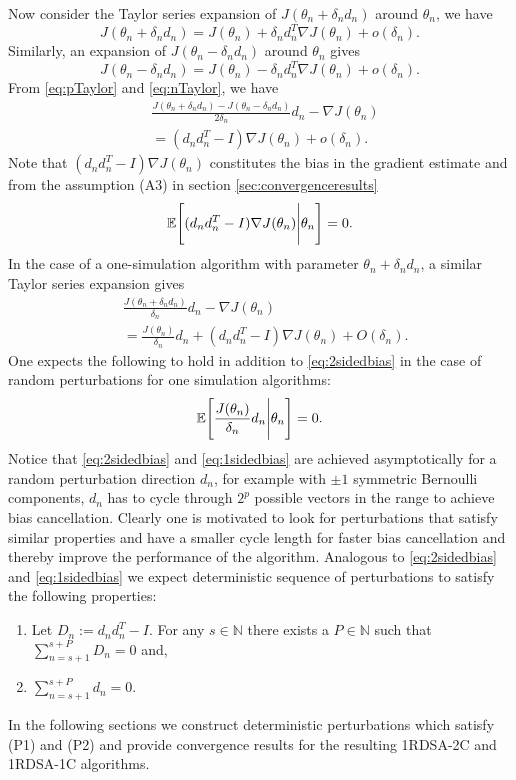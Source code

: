 \documentclass[letterpaper, 10 pt, conference]{ieeeconf}  %
\begin{document}
Now consider the Taylor series expansion of $J(\theta_n+\delta_nd_n)$ around
$\theta_n$, we have
\begin{equation} \label{eq:pTaylor}
J(\theta_n+\delta_nd_n)=
J(\theta_n)+\delta_nd_n^T \nabla J(\theta_n)+o(\delta_n).
\end{equation}
Similarly, an expansion of $J(\theta_n-\delta_n d_n)$ around $\theta_n$ gives
\begin{equation} \label{eq:nTaylor}
J(\theta_n-\delta_n d_n)=
J(\theta_n)-\delta_n d_n^T \nabla J(\theta_n)+o(\delta_n).
\end{equation}
From \eqref{eq:pTaylor} and \eqref{eq:nTaylor}, we have
\begin{align}\label{eq:Taylor}
&\frac{J(\theta_n+\delta_n d_n)-J(\theta_n-\delta_n d_n)}{2\delta_n}d_n
- \nabla J(\theta_n) \\
&= (d_nd_n^T-I)\nabla J(\theta_n)+o(\delta_n).
\end{align}
Note that $(d_nd_n^T-I)\nabla J(\theta_n)$ constitutes the bias in the
gradient estimate and
from the assumption (A3) in section \ref{sec:convergenceresults}
\begin{equation}\label{eq:2sidedbias}
\mathbb{E}\Bigg{[}(d_nd_n^T-I)\nabla J(\theta_n)\Bigg{|}\theta_n\Bigg{]}=0.
\end{equation}
In the case of a one-simulation algorithm with parameter $\theta_n+\delta_n d_n$,
a similar Taylor series expansion gives
\begin{align}\label{eq:1sided}
&\frac{J(\theta_n+\delta_n d_n)}{\delta_n}d_n
- \nabla J(\theta_n) \\
&=\frac{J(\theta_n)}{\delta_n}d_n
+(d_nd_n^T-I)\nabla J(\theta_n)+O(\delta_n).
\end{align}
One expects the following to hold in addition to \eqref{eq:2sidedbias} in the case of 
random perturbations for one simulation algorithms:
\begin{equation}\label{eq:1sidedbias}
\mathbb{E}\Bigg{[}\frac{J(\theta_n)}{\delta_n}d_n\Bigg{|}\theta_n\Bigg{]}=0. 
\end{equation}
Notice that \eqref{eq:2sidedbias} and \eqref{eq:1sidedbias} are achieved asymptotically 
for a random perturbation direction $d_n$, for example with $\pm 1$ symmetric Bernoulli 
components, $d_n$ has to cycle through $2^p$ possible vectors in the range to achieve bias 
cancellation. Clearly one is motivated to look for perturbations that satisfy similar 
properties and have a smaller cycle length for faster bias cancellation and thereby 
improve the performance of the algorithm. 
Analogous to \eqref{eq:2sidedbias} and \eqref{eq:1sidedbias} we expect deterministic sequence 
of perturbations to satisfy the following properties:
\begin{enumerate}[label=\textbf{(P\arabic*)}]
  \item Let $D_n:=d_nd_n^T-I.$ For any $s \in \mathbb{N}$ there exists a 
  $P \in \mathbb{N}$ such that $\sum\limits_{n=s+1}^{s+P}D_n=0$ and,
  \item  $\sum\limits_{n=s+1}^{s+P}d_n=0.$
\end{enumerate}
In the following sections we construct deterministic perturbations which satisfy (P1) and (P2)
and provide convergence results for the resulting 1RDSA-2C and 1RDSA-1C algorithms.
\end{document}
